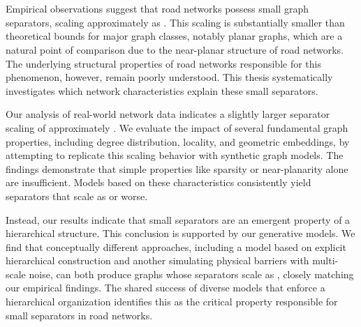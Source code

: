 \section*{\abstractname}

Empirical observations suggest that road networks possess small graph separators, scaling approximately as .
This scaling is substantially smaller than theoretical bounds for major graph classes, notably planar graphs, which are a natural point of comparison due to the near-planar structure of road networks.
The underlying structural properties of road networks responsible for this phenomenon, however, remain poorly understood.
This thesis systematically investigates which network characteristics explain these small separators.

Our analysis of real-world network data indicates a slightly larger separator scaling of approximately .
We evaluate the impact of several fundamental graph properties, including degree distribution, locality, and geometric embeddings, by attempting to replicate this scaling behavior with synthetic graph models.
The findings demonstrate that simple properties like sparsity or near-planarity alone are insufficient.
Models based on these characteristics consistently yield separators that scale as  or worse.

Instead, our results indicate that small separators are an emergent property of a hierarchical structure.
This conclusion is supported by our generative models.
We find that conceptually different approaches, including a model based on explicit hierarchical construction and another simulating physical barriers with multi-scale noise, can both produce graphs whose separators scale as , closely matching our empirical findings.
The shared success of diverse models that enforce a hierarchical organization identifies this as the critical property responsible for small separators in road networks.
